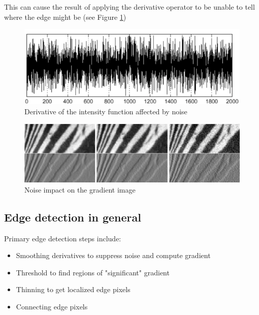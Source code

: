 This can cause the result of applying the derivative operator to be unable to tell where the edge might be (see Figure \ref{fig:noise_derivative})
\begin{figure}[H]
	\centering
	\includegraphics[width=\textwidth]{images/noise_derivative}
	\caption{Derivative of the intensity function affected by noise}
	\label{fig:noise_derivative}
\end{figure}
\begin{figure}[H]
	\centering
	\includegraphics[width=\textwidth]{images/noise_impact}
	\caption{Noise impact on the gradient image}
	\label{fig:noise_impact}
\end{figure}

\subsection{Edge detection in general\cite{digital-image-processing}}
Primary edge detection steps include:
\begin{itemize}
	\item Smoothing derivatives to suppress noise and compute gradient
	\item Threshold to find regions of "significant" gradient
	\item Thinning to get localized edge pixels
	\item Connecting edge pixels
\end{itemize}


